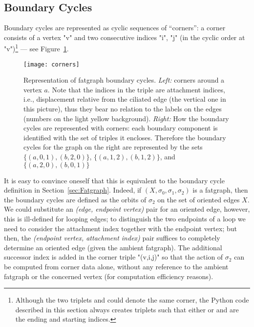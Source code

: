 \subsection{Boundary Cycles}
\label{sec:boundary-cycles}

Boundary cycles are represented as cyclic sequences of ``corners'': a
corner consists of a vertex "v" and two consecutive indices "i", "j"
(in the cyclic order at "v")\footnote{ Although the two triplets
   and  could denote the same corner, the
  Python code described in this section always creates triplets such
  that either  or  and  are the ending and
  starting indices.}  --- see Figure~\ref{fig:corners}.
\begin{figure}
  \label{fig:corners}
  \centering
  \texttt{[image: corners]}
  \caption{Representation of fatgraph boundary cycles. \emph{Left:}
    corners around a vertex $a$. Note that the indices in the triple
    are attachment indices, i.e., displacement relative from the
    ciliated edge (the vertical one in this picture), thus they bear
    no relation to the labels on the edges (numbers on the light
    yellow background). \emph{Right:} How the boundary cycles are
    represented with corners: each boundary component is identified
    with the set of triples it encloses. Therefore the boundary cycles
    for the graph on the right are represented by the sets $\{(a,0,1),
    (b,2,0)\}$, $\{(a,1,2), (b,1,2)\}$, and $\{(a,2,0), (b,0,1)\}$}
\end{figure}
It is easy to convince oneself that this is equivalent to the boundary
cycle definition in Section~\ref{sec:Fatgraph}.  Indeed, if $(X, \sigma_0,
\sigma_1, \sigma_2)$ is a fatgraph, then the boundary cycles are
defined as the orbits of $\sigma_2$ on the set of oriented edges
$X$. We could substitute an \emph{(edge, endpoint vertex)} pair for an
oriented edge, however, this is ill-defined for looping edges; to
distinguish the two endpoints of a loop we need to consider the
attachment index together with the endpoint vertex; but then, the
\emph{(endpoint vertex, attachment index)} pair suffices to completely
determine an oriented edge (given the ambient fatgraph).  The
additional successor index is added in the corner triple "(v,i,j)"
so that the action of $\sigma_2$ can be computed from corner data
alone, without any reference to the ambient fatgraph or the concerned
vertex (for computation efficiency reasons).

